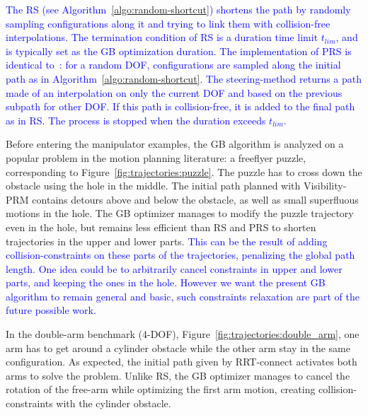 \documentclass{tADR2e}
\newcommand\conf{\mathbf{q}}
\begin{document}
\textcolor{blue}{
The RS (see Algorithm~\ref{algo:random-shortcut}) shortens the path by randomly sampling configurations along it and trying to link them with collision-free interpolations.
The termination condition of RS is a duration time limit $t_{lim}$, and is typically set as the GB optimization duration.
The implementation of PRS is identical to~\cite{GeraertsIJRR07}:
for a random DOF, configurations are sampled along the initial path as in 
Algorithm~\ref{algo:random-shortcut}. The steering-method returns a path 
made of an interpolation on only 
the current DOF and based on the previous subpath for other DOF. If this path is 
collision-free, it is added to the final path as in RS. The process is stopped when the duration exceeds $t_{lim}$.
}

\vspace{0.4cm}
Before entering the manipulator examples, the GB algorithm is analyzed 
on a popular problem in the motion planning literature: a freeflyer puzzle, 
corresponding to Figure~\ref{fig:trajectories:puzzle}. The 
puzzle has to cross down the 
obstacle using the hole in the middle. The initial path planned with Visibility-PRM 
contains detours above and below the obstacle, as well as small superfluous
motions in the hole. 
The GB optimizer manages to modify the puzzle trajectory even in the hole, but remains less efficient than RS and PRS to shorten trajectories in the upper and lower parts. 
\textcolor{blue}{
This can be the result of adding collision-constraints on these parts of the trajectories, penalizing the global path length. One idea could be to 	arbitrarily cancel constraints in upper and lower parts, and keeping the ones in the hole. However we want the present GB algorithm to remain general and basic, such constraints relaxation are part of the future possible work.
}

\vspace{0.4cm}

In the double-arm benchmark (4-DOF), 
Figure~\ref{fig:trajectories:double_arm}, one arm has 
to get around a cylinder obstacle while the 
other arm stay in the same configuration. As expected, the initial path given by 
RRT-connect activates both arms to solve the problem. Unlike RS, 
the GB optimizer manages to cancel the rotation of the free-arm while optimizing 
the first arm motion, creating collision-constraints with the cylinder obstacle.
\end{document}
